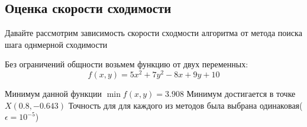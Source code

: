 \documentclass[a4paper, 14pt]{article}
\begin{document}
		\subsection*{Оценка скорости сходимости}
		Давайте рассмотрим зависимость скорости сходмости алгоритма от метода поиска шага однмерной сходимости 
		
		Без ограничений общности возьмем функцию от двух переменных:
		\[
		f(x, y) = 5x^2 + 7y^2 - 8x + 9y + 10
		\]
		
		Минимум данной функции $\min f(x, y) = 3.908$ 
		Минимум достигается в точке $X(0.8, -0.643)$
		Точность для для каждого из методов была выбрана одинаковая($\epsilon = 10^{-5}$)
		
		\begin{bchart}[step=2, max=25]
            \medskip
            \medskip
             \medskip
    \end{bchart} 
\end{document}
